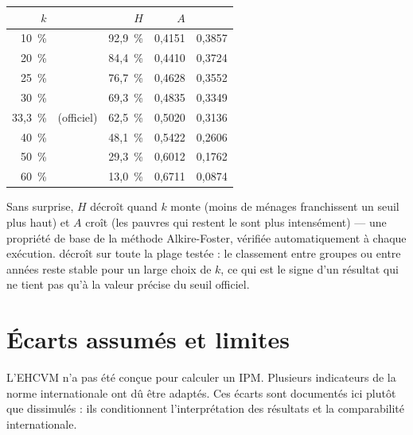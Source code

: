 \documentclass[11pt,a4paper]{article}
\begin{document}
\begin{center}
\begin{tabular}{@{}rrrrr@{}}
\toprule
\textbf{$k$} & & \textbf{$H$} & \textbf{$A$} & \textbf{\ipm{}} \\
\midrule
10~\% & & 92,9~\% & 0,4151 & 0,3857 \\
20~\% & & 84,4~\% & 0,4410 & 0,3724 \\
25~\% & & 76,7~\% & 0,4628 & 0,3552 \\
30~\% & & 69,3~\% & 0,4835 & 0,3349 \\
33,3~\% & (officiel) & 62,5~\% & 0,5020 & 0,3136 \\
40~\% & & 48,1~\% & 0,5422 & 0,2606 \\
50~\% & & 29,3~\% & 0,6012 & 0,1762 \\
60~\% & & 13,0~\% & 0,6711 & 0,0874 \\
\bottomrule
\end{tabular}
\end{center}

Sans surprise, $H$ décroît quand $k$ monte (moins de ménages franchissent un seuil plus haut) et
$A$ croît (les pauvres qui restent le sont plus intensément) --- une propriété de base de la
méthode Alkire-Foster, vérifiée automatiquement à chaque exécution. \ipm{} décroît sur toute la
plage testée : le classement entre groupes ou entre années reste stable pour un large choix de
$k$, ce qui est le signe d'un résultat qui ne tient pas qu'à la valeur précise du seuil officiel.

\section{Écarts assumés et limites}

L'EHCVM n'a pas été conçue pour calculer un IPM. Plusieurs indicateurs de la norme internationale
ont dû être adaptés. Ces écarts sont documentés ici plutôt que dissimulés : ils conditionnent
l'interprétation des résultats et la comparabilité internationale.
\end{document}
